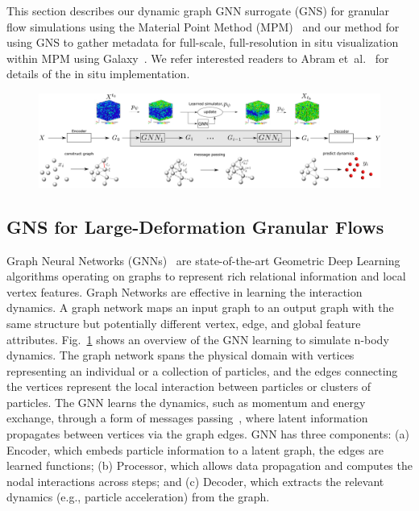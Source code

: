 \documentclass{vgtc}
\begin{document}
This section describes our dynamic graph GNN surrogate (GNS) for granular flow simulations using the Material Point Method (MPM)~\cite{kumar2019scalable,soga2016trends} and our method for using GNS to gather metadata for full-scale, full-resolution in situ visualization within MPM using Galaxy~\cite{abram18galaxy}. We refer interested readers to Abram et~al.~\cite{abram22insitu} for details of the in situ implementation.

\begin{figure}[!t]
    \centering
    \includegraphics[width=\textwidth]{figs/gnn.png}
    \label{fig:gnn}
\end{figure}
\subsection{GNS for Large-Deformation Granular Flows}
Graph Neural Networks (GNNs)~\cite{scarselli2008graph} are state-of-the-art Geometric Deep Learning algorithms operating on graphs to represent rich relational information and local vertex features.  Graph Networks are effective in learning the interaction dynamics.  A graph network maps an input graph to an output graph with the same structure but potentially different vertex, edge, and global feature attributes.  Fig.~\ref{fig:gnn} shows an overview of the GNN learning to simulate n-body dynamics.  The graph network spans the physical domain with vertices representing an individual or a collection of particles, and the edges connecting the vertices represent the local interaction between particles or clusters of particles.  The GNN learns the dynamics, such as momentum and energy exchange, through a form of messages passing~\cite{gilmer2017neural}, where latent information propagates between vertices via the graph edges.  GNN has three components: (a) Encoder, which embeds particle information to a latent graph, the edges are learned functions; (b) Processor, which allows data propagation and computes the nodal interactions across steps; and (c) Decoder, which extracts the relevant dynamics (e.g., particle acceleration) from the graph. 
\end{document}
